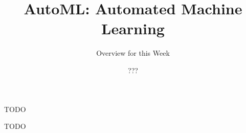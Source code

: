 




\title[AutoML: Overview]{AutoML: Automated Machine Learning}
\subtitle{Overview for this Week}
\author{???}
\date{}





	
	\maketitle
	

\begin{frame}[c]{TODO}

TODO

\end{frame}



